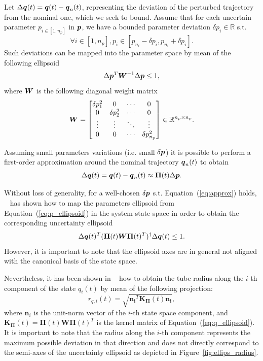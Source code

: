 Let $\Delta\boldsymbol{q}(t) = \boldsymbol{q}(t) - \boldsymbol{q}_n(t)$, representing the deviation of the perturbed trajectory from the nominal one, which we seek to bound.
Assume that for each uncertain parameter $p_{i \in [1, n_p]}$ in $\boldsymbol{p}$, we have a bounded parameter deviation $\delta p_i \in \mathbb{R}$ s.t. 
\begin{equation*}
  \forall i \in [1, n_p] ,p_i \in [p_{n_i}-\delta p_i, p_{n_i}+\delta p_i].
\end{equation*}
Such deviations can be mapped into the parameter space by mean of the following ellipsoid
\begin{equation}\label{eq:p_ellipsoid}
  \Delta\boldsymbol{p}^T \boldsymbol{W}^{-1} \Delta\boldsymbol{p} \leq 1,
\end{equation}
where $\boldsymbol{W}$ is the following diagonal weight matrix
\begin{equation*}
  \boldsymbol{W} = \begin{bmatrix}
    \delta p_1^2 & 0 & \cdots & 0 \\
    0 & \delta p_2^2 & \cdots & 0 \\
    \vdots & \vdots & \ddots & \vdots \\
    0 & 0 & \cdots & \delta p_{n_p}^2
    \end{bmatrix} \in \mathbb{R}^{n_p \times n_p}.
\end{equation*}

Assuming small parameters variations (i.e. small $\delta \boldsymbol{p}$) it is possible to perform a first-order approximation around the nominal trajectory $\boldsymbol{q}_n(t)$ to obtain 
\begin{equation}\label{eq:approx}
  \Delta\boldsymbol{q}(t) =  \boldsymbol{q}(t) - \boldsymbol{q}_n(t) \approx \boldsymbol{\Pi}(t) \Delta\boldsymbol{p}.
\end{equation}

Without loss of generality, for a well-chosen $\delta \boldsymbol{p}$ s.t. Equation~(\ref{eq:approx}) holds, ~\cite{cTube} has shown how to map the parameters ellipsoid from Equation~(\ref{eq:p_ellipsoid}) in the system state space in order to obtain the corresponding uncertainty ellipsoid
\begin{equation}\label{eq:q_ellipsoid}
  \Delta\boldsymbol{q}(t)^T (\boldsymbol{\Pi}(t) \boldsymbol{W} \boldsymbol{\Pi}(t)^T)^\dag \Delta\boldsymbol{q}(t) \leq 1.
\end{equation}
However, it is important to note that the ellipsoid axes are in general not aligned with the canonical basis of the state space.

Nevertheless, it has been shown in ~\cite{cTube} how to obtain the tube radius along the $i$-th component of the state $q_i(t)$ by mean of the following projection:
\begin{equation}\label{eq:radius}
  r_{q,i}(t) =  \sqrt{\boldsymbol{n_i}^{T} \boldsymbol{K_{\Pi}}(t) \boldsymbol{n_i}},
\end{equation}
where $\boldsymbol{n}_i$ is the unit-norm vector of the $i$-th state space component, and $\boldsymbol{K_{\Pi}}(t) = \boldsymbol{\Pi}(t)\boldsymbol{W}\boldsymbol{\Pi}(t)^T$ is the kernel matrix of Equation~(\ref{eq:q_ellipsoid}).
It is important to note that the radius along the $i$-th component represents the maximum possible deviation in that direction and does not directly correspond to the semi-axes of the uncertainty ellipsoid as depicted in Figure~\ref{fig:ellips_radius}.

